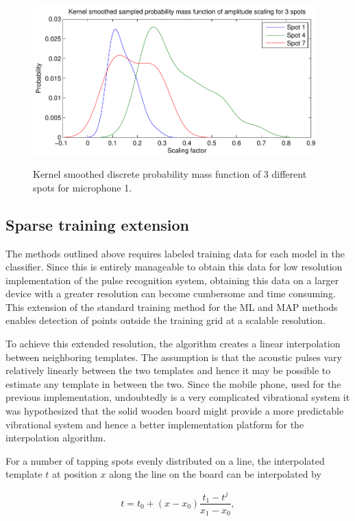 \begin{figure}
\centering
  \includegraphics[width=110mm]{amplitudeProbMass.pdf}\\
  \caption{Kernel smoothed discrete probability mass function of 3 different spots for microphone 1.}\label{fig:amplitudeProbMass.pdf}
\end{figure}

\subsection{Sparse training extension}\label{sec:APRspareTraining}
The methods outlined above requires labeled training data for each model in the classifier. Since this is entirely manageable to obtain this data for low resolution implementation of the pulse recognition system, obtaining this data on a larger device with a greater resolution can become cumbersome and time consuming. This extension of the standard training method for the ML and MAP methods enables detection of points outside the training grid at a scalable resolution.

To achieve this extended resolution, the algorithm creates a linear interpolation between neighboring templates. The assumption is that the acoustic pulses vary relatively linearly between the two templates and hence it may be possible to estimate any template in between the two. Since the mobile phone, used for the previous implementation, undoubtedly is a very complicated vibrational system it was hypothesized that the solid wooden board might provide a more predictable vibrational system and hence a better implementation platform for the interpolation algorithm.

For a number of tapping spots evenly distributed on a line, the interpolated template $t$ at position $x$ along the line on the board can be interpolated by

\begin{equation}\label{eq:interp}
t = t_0 + \left(x - x_0\right) \frac{t_{1} - t^j}{x_1 - x_0},
\end{equation}

